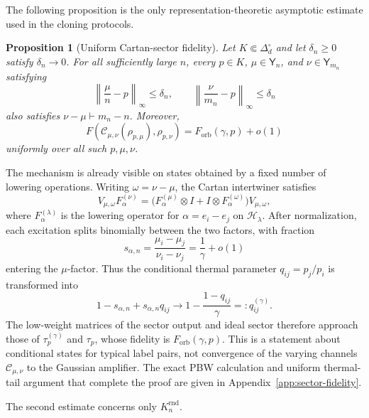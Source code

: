 \documentclass[11pt]{article}
\newtheorem{proposition}[proposition]{Proposition}
\theoremstyle{remark}
\theoremstyle{plain}
\newcommand{\cC}{\mathcal C}
\newcommand{\cH}{\mathcal H}
\newcommand{\ot}{\otimes}
\newcommand{\Forb}{F_{\mathrm{orb}}}
\begin{document}
The following proposition is the only representation-theoretic asymptotic
estimate used in the cloning protocols.

\begin{proposition}[Uniform Cartan-sector fidelity]
\label{prop:sector-fidelity}
Let \(K\Subset\Delta_d^\circ\) and let \(\delta_n\ge0\) satisfy
\(\delta_n\to0\).  For all sufficiently large \(n\), every
\(p\in K\), \(\mu\in\mathsf Y_n\), and \(\nu\in\mathsf Y_{m_n}\) satisfying
\[
  \left\|\frac\mu n-p\right\|_\infty\le\delta_n,
  \qquad
  \left\|\frac\nu{m_n}-p\right\|_\infty\le\delta_n
\]
also satisfies \(\nu-\mu\vdash m_n-n\).  Moreover,
\[
  F\!\left(\cC_{\mu,\nu}(\rho_{p,\mu}),\rho_{p,\nu}\right)
  =\Forb(\gamma,p)+o(1)
\]
uniformly over all such \(p,\mu,\nu\).
\end{proposition}

The mechanism is already visible on states obtained by a fixed number of
lowering operations.  Writing \(\omega=\nu-\mu\), the Cartan intertwiner
satisfies
\[
  V_{\mu,\omega}F_\alpha^{(\nu)}
  =\bigl(F_\alpha^{(\mu)}\ot I+I\ot F_\alpha^{(\omega)}\bigr)
    V_{\mu,\omega},
\]
where \(F_\alpha^{(\lambda)}\) is the lowering operator for
\(\alpha=e_i-e_j\) on \(\cH_\lambda\).  After normalization, each excitation
splits binomially between the two factors, with fraction
\[
  s_{\alpha,n}
  =\frac{\mu_i-\mu_j}{\nu_i-\nu_j}
  =\frac1\gamma+o(1)
\]
entering the \(\mu\)-factor.  Thus the conditional thermal parameter
\(q_{ij}=p_j/p_i\) is transformed into
\[
  1-s_{\alpha,n}+s_{\alpha,n}q_{ij}
  \longrightarrow
  1-\frac{1-q_{ij}}{\gamma}
  =:q_{ij}^{(\gamma)}.
\]
The low-weight matrices of the sector output and ideal sector therefore
approach those of \(\tau_p^{(\gamma)}\) and \(\tau_p\), whose fidelity is
\(\Forb(\gamma,p)\).  This is a statement about conditional states for
typical label pairs, not convergence of the varying channels
\(\cC_{\mu,\nu}\) to the Gaussian amplifier.  The exact PBW calculation and
uniform thermal-tail argument that complete the proof are given in
Appendix~\ref{app:sector-fidelity}.

The second estimate concerns only \(K_n^{\mathrm{rnd}}\).
\end{document}
